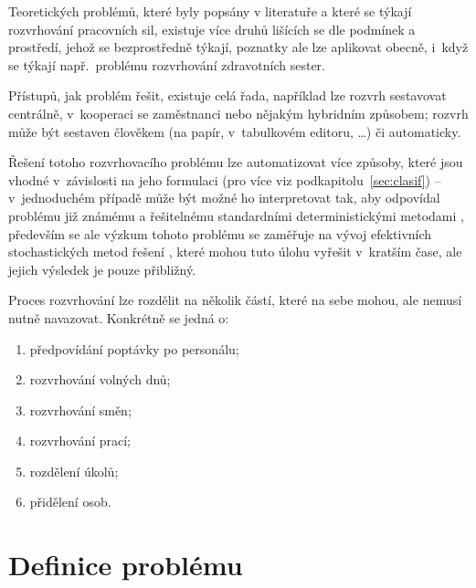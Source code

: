 \documentclass[twoside]{ctuthesis}
\begin{document}
Teoretických problémů, které byly popsány v literatuře a které se týkají rozvrhování pracovních sil, existuje více druhů lišících se dle podmínek a prostředí, jehož se bezprostředně týkají, poznatky ale lze aplikovat obecně, i~když se týkají např.~problému rozvrhování zdravotních sester.

Přístupů, jak problém řešit, existuje celá řada, například lze rozvrh sestavovat centrálně, v~kooperaci se zaměstnanci nebo nějakým hybridním způsobem; rozvrh může být sestaven člověkem (na papír, v~tabulkovém editoru, \ldots) či automaticky.

Řešení totoho rozvrhovacího problému lze automatizovat více způsoby, které jsou vhodné v~závislosti na jeho formulaci (pro více viz podkapitolu~\ref{sec:clasif}) -- v~jednoduchém případě může být možné ho interpretovat tak, aby odpovídal problému již známému a řešitelnému standardními deterministickými metodami \cite{blochliger2004modeling}, především se ale výzkum tohoto problému se zaměřuje na vývoj efektivních stochastických metod řešení \cite{adamuthe2012tabu}, které mohou tuto úlohu vyřešit v~kratším čase, ale jejich výsledek je pouze přibližný.



Proces rozvrhování lze rozdělit na několik částí, které na sebe mohou, ale nemusí nutně navazovat. \cite{ernst2004staff} Konkrétně se jedná o:
\begin{enumerate}
	\item předpovídání poptávky po personálu;
	\item rozvrhování volných dnů;
	\item rozvrhování směn;
	\item rozvrhování prací;
	\item rozdělení úkolů;
	\item přidělení osob.
\end{enumerate}

\section{Definice problému}
\end{document}
